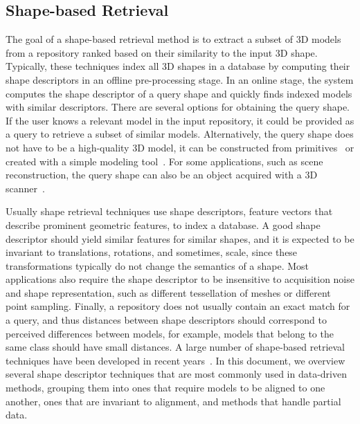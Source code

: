 \subsection{Shape-based Retrieval}
\label{sec:shapeBasedSearch}
The goal of a shape-based retrieval method is to extract a subset of 3D models from a repository ranked based on their similarity to the input 3D shape. Typically, these techniques index all 3D shapes in a database by computing their shape descriptors in an offline pre-processing stage. In an online stage, the system computes the shape descriptor of a query shape and quickly finds indexed models with similar descriptors.  There are several options for obtaining the query shape. If the user knows a relevant model in the input repository, it could be provided as a query to retrieve a subset of similar models.  Alternatively, the query shape does not have to be a high-quality 3D model, it can be constructed from primitives~\cite{Funkhouser:2004:MBE} or created with a simple modeling tool~\cite{Chaudhuri:2010:ddsc}. For some applications, such as scene reconstruction, the query shape can also be an object acquired with a 3D scanner~\cite{Nan:2012:SAC}.  

Usually shape retrieval techniques use shape descriptors, feature vectors that describe prominent geometric features, to index a database.  A good shape descriptor should yield similar features for similar shapes, and it is expected to be invariant to translations, rotations, and sometimes, scale, since these transformations typically do not change the semantics of a shape.  Most applications also require the shape descriptor to be insensitive to acquisition noise and shape representation, such as different tessellation of meshes or different point sampling. Finally, a repository does not usually contain an exact match for a query, and thus distances between shape descriptors should correspond to perceived differences between models, for example, models that belong to the same class should have small distances. A large number of shape-based retrieval techniques have been developed in recent years~\cite{Tangelder:2008:ASC}. In this document, we overview several shape descriptor techniques that are most commonly used in data-driven methods, grouping them into ones that require models to be aligned to one another, ones that are invariant to alignment, and methods that handle partial data.

